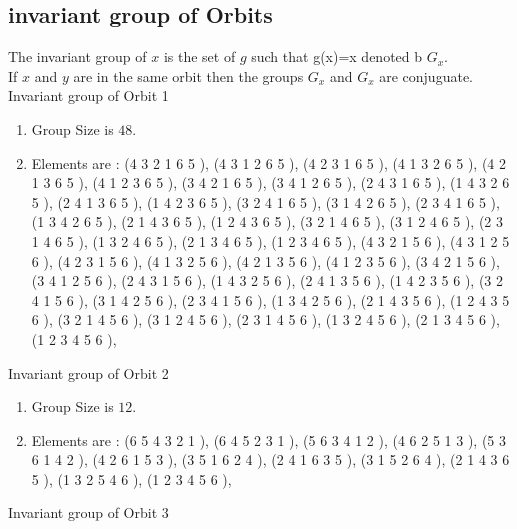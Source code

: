 \documentclass[12pt]{article}
\begin{document}
\subsection{invariant group of Orbits}
\noindent The invariant group of $x$ is the set of $g$ such that g(x)=x denoted b $G_x$.\\
If $x$ and $y$ are in the same orbit then the groups $G_x$ and  $G_x$ are conjuguate.\\
Invariant group of Orbit 1
\begin{enumerate}
\item Group Size is $48$.
\item Elements are : (4 3 2 1 6 5  ), (4 3 1 2 6 5  ), (4 2 3 1 6 5  ), (4 1 3 2 6 5  ), (4 2 1 3 6 5  ), (4 1 2 3 6 5  ), (3 4 2 1 6 5  ), (3 4 1 2 6 5  ), (2 4 3 1 6 5  ), (1 4 3 2 6 5  ), (2 4 1 3 6 5  ), (1 4 2 3 6 5  ), (3 2 4 1 6 5  ), (3 1 4 2 6 5  ), (2 3 4 1 6 5  ), (1 3 4 2 6 5  ), (2 1 4 3 6 5  ), (1 2 4 3 6 5  ), (3 2 1 4 6 5  ), (3 1 2 4 6 5  ), (2 3 1 4 6 5  ), (1 3 2 4 6 5  ), (2 1 3 4 6 5  ), (1 2 3 4 6 5  ), (4 3 2 1 5 6  ), (4 3 1 2 5 6  ), (4 2 3 1 5 6  ), (4 1 3 2 5 6  ), (4 2 1 3 5 6  ), (4 1 2 3 5 6  ), (3 4 2 1 5 6  ), (3 4 1 2 5 6  ), (2 4 3 1 5 6  ), (1 4 3 2 5 6  ), (2 4 1 3 5 6  ), (1 4 2 3 5 6  ), (3 2 4 1 5 6  ), (3 1 4 2 5 6  ), (2 3 4 1 5 6  ), (1 3 4 2 5 6  ), (2 1 4 3 5 6  ), (1 2 4 3 5 6  ), (3 2 1 4 5 6  ), (3 1 2 4 5 6  ), (2 3 1 4 5 6  ), (1 3 2 4 5 6  ), (2 1 3 4 5 6  ), (1 2 3 4 5 6  ), 
\end{enumerate}
Invariant group of Orbit 2
\begin{enumerate}
\item Group Size is $12$.
\item Elements are : (6 5 4 3 2 1  ), (6 4 5 2 3 1  ), (5 6 3 4 1 2  ), (4 6 2 5 1 3  ), (5 3 6 1 4 2  ), (4 2 6 1 5 3  ), (3 5 1 6 2 4  ), (2 4 1 6 3 5  ), (3 1 5 2 6 4  ), (2 1 4 3 6 5  ), (1 3 2 5 4 6  ), (1 2 3 4 5 6  ), 
\end{enumerate}
Invariant group of Orbit 3
\end{document}
